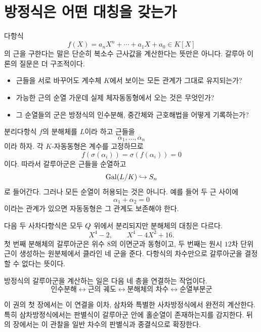 \chapter{방정식은 어떤 대칭을 갖는가}
\label{chap:volume3-motivation}

다항식
\[
  f(X)=a_nX^n+\cdots+a_1X+a_0\in K[X]
\]
의 근을 구한다는 말은 단순히 복소수 근사값을 계산한다는 뜻만은 아니다. 갈루아 이론의 질문은 더 구조적이다.

\begin{itemize}
  \item 근들을 서로 바꾸어도 계수체 $K$에서 보이는 모든 관계가 그대로 유지되는가?
  \item 가능한 근의 순열 가운데 실제 체자동동형에서 오는 것은 무엇인가?
  \item 그 순열들의 군은 방정식의 인수분해, 중간체와 근호해법을 어떻게 기록하는가?
\end{itemize}

분리다항식 $f$의 분해체를 $L$이라 하고 근들을
\[
  \alpha_1,\dots,\alpha_n
\]
이라 하자. 각 $K$-자동동형은 계수를 고정하므로
\[
  f(\sigma(\alpha_i))=\sigma(f(\alpha_i))=0
\]
이다. 따라서 갈루아군은 근들을 순열하고
\[
  \operatorname{Gal}(L/K)\hookrightarrow S_n
\]
로 들어간다. 그러나 모든 순열이 허용되는 것은 아니다. 예를 들어 두 근 사이에
\[
  \alpha_1+\alpha_2=0
\]
이라는 관계가 있으면 자동동형은 그 관계도 보존해야 한다.

\begin{example}[같은 차수, 다른 대칭]
다음 두 사차다항식은 모두 $Q$ 위에서 분리되지만 분해체의 대칭은 다르다.
\[
  X^4-2,
  \qquad
  X^4-4X^2+16.
\]
첫 번째 분해체의 갈루아군은 위수 $8$의 이면군과 동형이고, 두 번째는 원시 $12$차 단위근이 생성하는 원분체에서 클라인 네 군을 준다. 다항식의 차수만으로 갈루아군을 결정할 수 없다는 뜻이다.
\end{example}

\begin{keyidea}
방정식의 갈루아군을 계산하는 일은 다음 네 층을 연결하는 작업이다.
\[
  \boxed{
  \text{인수분해}
  \longleftrightarrow
  \text{근의 궤도}
  \longleftrightarrow
  \text{분해체의 차수}
  \longleftrightarrow
  \text{순열부분군}
  }
\]
\end{keyidea}

이 권의 첫 장에서는 이 연결을 이차, 삼차와 특별한 사차방정식에서 완전히 계산한다. 특히 삼차방정식에서는 판별식이 갈루아군 안에 홀순열이 존재하는지를 감지한다. 뒤의 장에서는 이 관찰을 일반 차수의 판별식과 종결식으로 확장한다.
